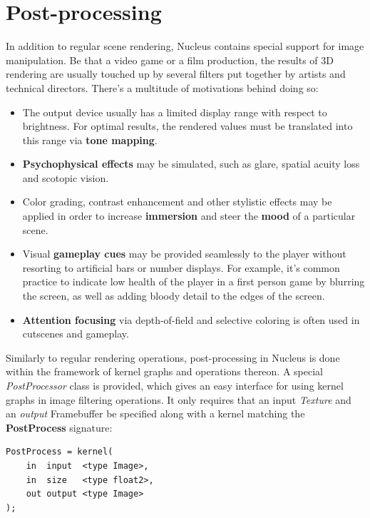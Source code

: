 \section{Post-processing}
\label{sec:PostProcessing}

In addition to regular scene rendering, Nucleus contains special support for image manipulation. Be that a video game or a film production, the results of 3D rendering are usually touched up by several filters put together by artists and technical directors. There's a multitude of motivations behind doing so:

\begin{itemize}
\item The output device usually has a limited display range with respect to brightness. For optimal results, the rendered values must be translated into this range via \textbf{tone mapping}.
\item \textbf{Psychophysical effects} may be simulated, such as glare, spatial acuity loss and scotopic vision.
\item Color grading, contrast enhancement and other stylistic effects may be applied in order to increase \textbf{immersion} and steer the \textbf{mood} of a particular scene.
\item Visual \textbf{gameplay cues} may be provided seamlessly to the player without resorting to artificial bars or number displays. For example, it's common practice to indicate low health of the player in a first person game by blurring the screen, as well as adding bloody detail to the edges of the screen.
\item \textbf{Attention focusing} via depth-of-field and selective coloring is often used in cutscenes and gameplay.
\end{itemize}

Similarly to regular rendering operations, post-processing in Nucleus is done within the framework of kernel graphs and operations thereon. A special \emph{PostProcessor} class is provided, which gives an easy interface for using kernel graphs in image filtering operations. It only requires that an input \emph{Texture} and an \emph{output} Framebuffer be specified along with a kernel matching the \textbf{PostProcess} signature:

\begin{lstlisting}[frame=single]
PostProcess = kernel(
    in  input  <type Image>,
    in  size   <type float2>,
    out output <type Image>
);
\end{lstlisting}


